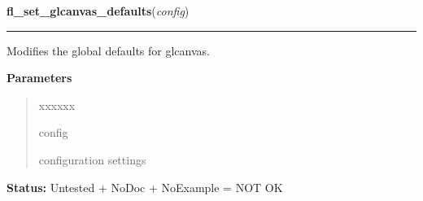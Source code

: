     \label{xformslib:library:fl_set_glcanvas_defaults}

    \vspace{0.5ex}

\hspace{.8\funcindent}\begin{boxedminipage}{\funcwidth}

    \raggedright \textbf{fl\_set\_glcanvas\_defaults}(\textit{config})

    \vspace{-1.5ex}

    \rule{\textwidth}{0.5\fboxrule}
\setlength{\parskip}{2ex}
    Modifies the global defaults for glcanvas.

\setlength{\parskip}{1ex}
      \textbf{Parameters}
      \vspace{-1ex}

      \begin{quote}
        \begin{Ventry}{xxxxxx}

          \item[config]

          configuration settings

        \end{Ventry}

      \end{quote}

\textbf{Status:} Untested + NoDoc + NoExample = NOT OK



    \end{boxedminipage}

    \label{xformslib:library:fl_get_glcanvas_defaults}

    \vspace{0.5ex}

